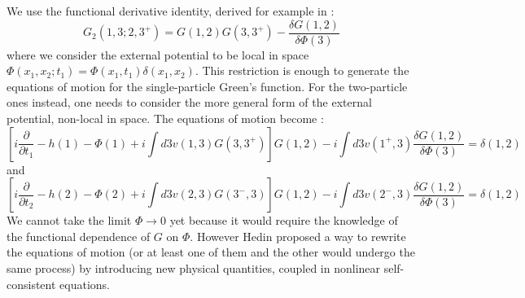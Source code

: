 We use the functional derivative identity, derived for example in \cite{strinati1988application} :
\begin{equation}
	G_2(1,3;2,3^+) = G(1,2)G(3,3^+) - \frac{\delta G(1,2)}{\delta \Phi(3)} \label{eq:2GF_dPhi}
\end{equation}
where we consider the external potential to be local in space $\Phi(x_1,x_2;t_1) = \Phi(x_1,t_1)\delta(x_1,x_2)$. This restriction is enough to generate the equations of motion for the single-particle Green's function. For the two-particle ones instead, one needs to consider the more general form of the external potential, non-local in space.
The equations of motion become :
\begin{equation}
	\left[ i \frac{\partial}{\partial t_1} - h(1) - \Phi(1) + i \int d3 v(1,3)G(3,3^+) \right] G(1,2) - i \int d3 v(1^+,3) \frac{\delta G(1,2)}{\delta \Phi(3)} = \delta(1,2)
\end{equation}
and
\begin{equation}
	\left[ i \frac{\partial}{\partial t_2} - h(2) - \Phi(2) + i \int d3 v(2,3)G(3^-,3) \right] G(1,2) - i \int d3 v(2^-,3) \frac{\delta G(1,2)}{\delta \Phi(3)} = \delta(1,2)
\end{equation}
We cannot take the limit $\Phi \to 0$ yet because it would require the knowledge of the functional dependence of $G$ on $\Phi$. However Hedin proposed a way to rewrite the equations of motion (or at least one of them and the other would undergo the same process) by introducing new physical quantities, coupled in nonlinear self-consistent equations.\cite{hedin1965new} 
%

